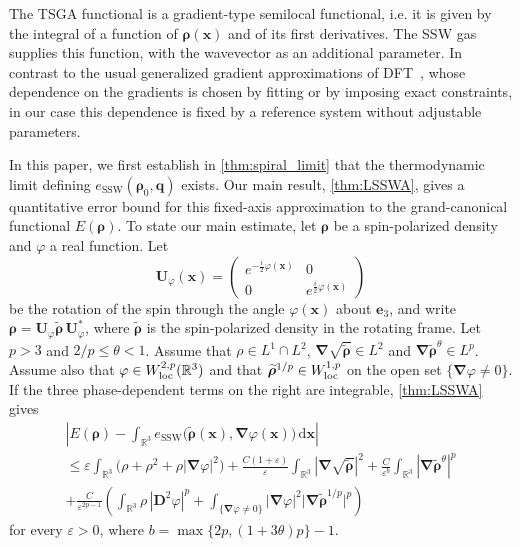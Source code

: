 \documentclass[final,reqno]{amsart}
\theoremstyle{remark}
\renewcommand{\le}{\leqslant}
\renewcommand{\epsilon}{\varepsilon}
\newcommand{\wt}[1]{\widetilde{#1}}
\newcommand{\RR}{\mathbb{R}}
\newcommand{\SSW}{\mathrm{SSW}}
\newcommand{\grad}{\bm{\nabla}}
\newcommand{\dd}{\mathrm{d}}
\begin{document}
The TSGA functional is a gradient-type semilocal functional, i.e. it is given by the integral of a function of $\bm{\rho}(\mathbf{x})$ and of its first derivatives. The SSW gas supplies this function, with the wavevector as an additional parameter. In contrast to the usual generalized gradient approximations of DFT~\cite{engel2011density}, whose dependence on the gradients is chosen by fitting or by imposing exact constraints, in our case this dependence is fixed by a reference system without adjustable parameters.

In this paper, we first establish in \cref{thm:spiral_limit} that the thermodynamic limit defining $e_\SSW(\bm{\rho}_0,\mathbf{q})$ exists. Our main result, \cref{thm:LSSWA}, gives a quantitative error bound for this fixed-axis approximation to the grand-canonical functional $E(\bm{\rho})$.
To state our main estimate, let $\bm{\rho}$ be a spin-polarized density and $\varphi$ a real function. Let
\[
 \mathbf{U}_\varphi(\mathbf{x})=\begin{pmatrix}e^{-\frac i2\varphi(\mathbf{x})}&0\\0&e^{\frac i2\varphi(\mathbf{x})}\end{pmatrix}
\]
be the rotation of the spin through the angle $\varphi(\mathbf{x})$ about $\mathbf{e}_3$, and write $\bm{\rho}=\mathbf{U}_\varphi\wt{\bm{\rho}}\,\mathbf{U}_\varphi^*$, where $\wt{\bm{\rho}}$ is the spin-polarized density in the rotating frame. Let $p>3$ and $2/p\le\theta<1$. Assume that $\rho\in L^1\cap L^2$, $\grad\sqrt{\wt{\bm{\rho}}}\in L^2$ and $\grad\wt{\bm{\rho}}^\theta\in L^p$. Assume also that $\varphi\in W^{2,p}_{\rm loc}(\RR^3)$ and that $\wt{\bm{\rho}}^{1/p}\in W^{1,p}_{\rm loc}$ on the open set $\{\grad\varphi\ne0\}$. If the three phase-dependent terms on the right are integrable, \cref{thm:LSSWA} gives
\begin{multline}\label{eq:TSGA_estim_intro}
 \left|E(\bm{\rho})-\int_{\RR^3}e_\SSW\big(\wt{\bm{\rho}}(\mathbf{x}),\grad\varphi(\mathbf{x})\big)\,\dd\mathbf{x}\right|\\
 \le \epsilon\int_{\RR^3}\big(\rho+\rho^2+\rho|\grad\varphi|^2\big)
 +\frac{C(1+\epsilon)}{\epsilon}\int_{\RR^3}|\grad\sqrt{\wt{\bm{\rho}}}|^2
 +\frac{C}{\epsilon^b}\int_{\RR^3}|\grad\wt{\bm{\rho}}^\theta|^p\\
 +\frac{C}{\epsilon^{2p-1}}\left(\int_{\RR^3}\rho\,|\mathbf{D}^2\varphi|^p
 +\int_{\{\grad\varphi\ne0\}}|\grad\varphi|^2\big|\grad\wt{\bm{\rho}}^{1/p}\big|^p\right)
\end{multline}
for every $\epsilon>0$, where $b=\max\{2p,(1+3\theta)p\}-1$.
\end{document}
